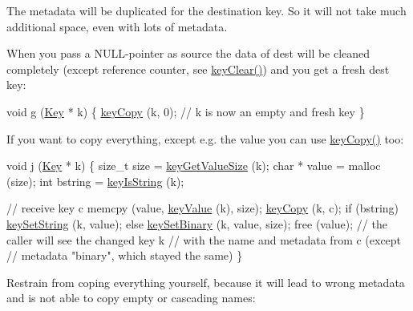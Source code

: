 The metadata will be duplicated for the destination key. So it will not take much additional space, even with lots of metadata.

When you pass a N\+U\+L\+L-\/pointer as source the data of dest will be cleaned completely (except reference counter, see \hyperlink{group__key_gab2242311a36bbc0520e0d36895107ec1}{key\+Clear()}) and you get a fresh dest key\+:


\begin{DoxyCodeInclude}
\textcolor{keywordtype}{void} g (\hyperlink{classkdb_1_1Key_a5679f5cae63caddd64a60388b9cc77fa}{Key} * k)
\{
        \hyperlink{group__key_ga6a12cbbe656a1ad9f41b8c681d7a2f92}{keyCopy} (k, 0);
        \textcolor{comment}{// k is now an empty and fresh key}
\}
\end{DoxyCodeInclude}
 If you want to copy everything, except e.\+g. the value you can use \hyperlink{group__key_ga6a12cbbe656a1ad9f41b8c681d7a2f92}{key\+Copy()} too\+:


\begin{DoxyCodeInclude}
\textcolor{keywordtype}{void} j (\hyperlink{classkdb_1_1Key_a5679f5cae63caddd64a60388b9cc77fa}{Key} * k)
\{
        \textcolor{keywordtype}{size\_t} size = \hyperlink{group__keyvalue_gae326672fffb7474abfe9baf53b73217e}{keyGetValueSize} (k);
        \textcolor{keywordtype}{char} * value = malloc (size);
        \textcolor{keywordtype}{int} bstring = \hyperlink{group__keytest_gaea7670778abd07fee0fe8ac12a149190}{keyIsString} (k);

        \textcolor{comment}{// receive key c}
        memcpy (value, \hyperlink{group__keyvalue_ga6f29609c5da53c6dc26a98678d5752af}{keyValue} (k), size);
        \hyperlink{group__key_ga6a12cbbe656a1ad9f41b8c681d7a2f92}{keyCopy} (k, c);
        \textcolor{keywordflow}{if} (bstring)
                \hyperlink{group__keyvalue_ga622bde1eb0e0c4994728331326340ef2}{keySetString} (k, value);
        \textcolor{keywordflow}{else}
                \hyperlink{group__keyvalue_gaa50a5358fd328d373a45f395fa1b99e7}{keySetBinary} (k, value, size);
        free (value);
        \textcolor{comment}{// the caller will see the changed key k}
        \textcolor{comment}{// with the name and metadata from c (except}
        \textcolor{comment}{// metadata "binary", which stayed the same)}
\}
\end{DoxyCodeInclude}
 Restrain from coping everything yourself, because it will lead to wrong metadata and is not able to copy empty or cascading names\+:


